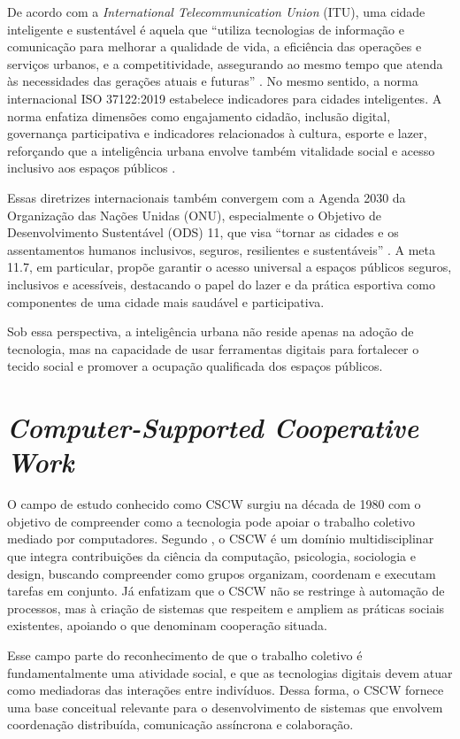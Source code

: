         De acordo com a \textit{International Telecommunication Union} (ITU), uma cidade inteligente e sustentável é aquela que “utiliza tecnologias de informação e comunicação para melhorar a qualidade de vida, a eficiência das operações e serviços urbanos, e a competitividade, assegurando ao mesmo tempo que atenda às necessidades das gerações atuais e futuras” \cite{ITUY4900}. No mesmo sentido, a norma internacional ISO 37122:2019 estabelece indicadores para cidades inteligentes. A norma enfatiza dimensões como engajamento cidadão, inclusão digital, governança participativa e indicadores relacionados à cultura, esporte e lazer, reforçando que a inteligência urbana envolve também vitalidade social e acesso inclusivo aos espaços públicos \cite{ISO37122}.

        Essas diretrizes internacionais também convergem com a Agenda 2030 da Organização das Nações Unidas (ONU), especialmente o Objetivo de Desenvolvimento Sustentável (ODS) 11, que visa “tornar as cidades e os assentamentos humanos inclusivos, seguros, resilientes e sustentáveis” \cite{ONU2015}. A meta 11.7, em particular, propõe garantir o acesso universal a espaços públicos seguros, inclusivos e acessíveis, destacando o papel do lazer e da prática esportiva como componentes de uma cidade mais saudável e participativa.

        Sob essa perspectiva, a inteligência urbana não reside apenas na adoção de tecnologia, mas na capacidade de usar ferramentas digitais para fortalecer o tecido social e promover a ocupação qualificada dos espaços públicos.

    \section{\textit{Computer-Supported Cooperative Work}}
        \label{sec:cscw}
        O campo de estudo conhecido como CSCW surgiu na década de 1980 com o objetivo de compreender como a tecnologia pode apoiar o trabalho coletivo mediado por computadores. Segundo , o CSCW é um domínio multidisciplinar que integra contribuições da ciência da computação, psicologia, sociologia e design, buscando compreender como grupos organizam, coordenam e executam tarefas em conjunto. Já  enfatizam que o CSCW não se restringe à automação de processos, mas à criação de sistemas que respeitem e ampliem as práticas sociais existentes, apoiando o que denominam cooperação situada. 

        Esse campo parte do reconhecimento de que o trabalho coletivo é fundamentalmente uma atividade social, e que as tecnologias digitais devem atuar como mediadoras das interações entre indivíduos. Dessa forma, o CSCW fornece uma base conceitual relevante para o desenvolvimento de sistemas que envolvem coordenação distribuída, comunicação assíncrona e colaboração.

